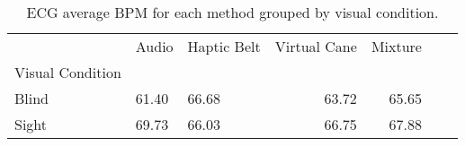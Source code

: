 
\begin{table}[!htb]
\centering
\caption{ECG average BPM for each method grouped by visual condition.}
\label{tab:bpm_average_group_noBase [BPM]}
\begin{tabular}{lllrrrr}
\toprule
{} &  Audio & Haptic Belt & Virtual Cane & Mixture \\
Visual Condition &        &             &              &         \\
\midrule
Blind            &  61.40 &       66.68 &        63.72 &   65.65 \\
Sight            &  69.73 &       66.03 &        66.75 &   67.88 \\
\bottomrule
\end{tabular}
\end{table}

